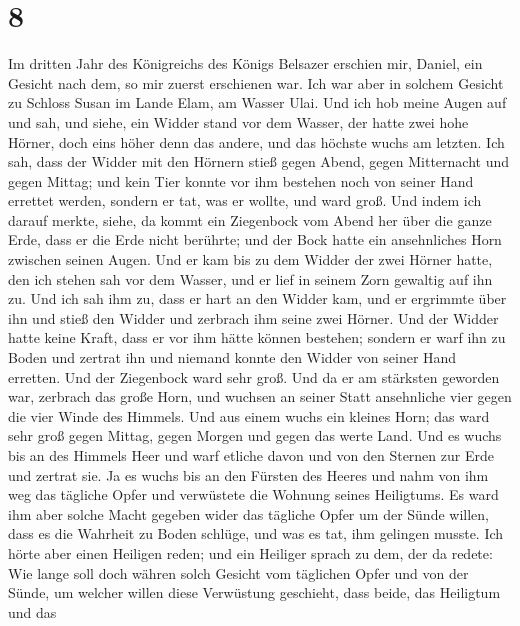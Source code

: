 \hypertarget{section-7}{%
\section{8}\label{section-7}}

 Im dritten Jahr des Königreichs des Königs Belsazer
erschien mir, Daniel, ein Gesicht nach dem, so mir zuerst erschienen
war.  Ich war aber in solchem Gesicht zu Schloss Susan im
Lande Elam, am Wasser Ulai.  Und ich hob meine Augen auf
und sah, und siehe, ein Widder stand vor dem Wasser, der hatte zwei hohe
Hörner, doch eins höher denn das andere, und das höchste wuchs am
letzten.  Ich sah, dass der Widder mit den Hörnern stieß
gegen Abend, gegen Mitternacht und gegen Mittag; und kein Tier konnte
vor ihm bestehen noch von seiner Hand errettet werden, sondern er tat,
was er wollte, und ward groß.  Und indem ich darauf
merkte, siehe, da kommt ein Ziegenbock vom Abend her über die ganze
Erde, dass er die Erde nicht berührte; und der Bock hatte ein
ansehnliches Horn zwischen seinen Augen.  Und er kam bis
zu dem Widder der zwei Hörner hatte, den ich stehen sah vor dem Wasser,
und er lief in seinem Zorn gewaltig auf ihn zu.  Und ich
sah ihm zu, dass er hart an den Widder kam, und er ergrimmte über ihn
und stieß den Widder und zerbrach ihm seine zwei Hörner. Und der Widder
hatte keine Kraft, dass er vor ihm hätte können bestehen; sondern er
warf ihn zu Boden und zertrat ihn und niemand konnte den Widder von
seiner Hand erretten.  Und der Ziegenbock ward sehr groß.
Und da er am stärksten geworden war, zerbrach das große Horn, und
wuchsen an seiner Statt ansehnliche vier gegen die vier Winde des
Himmels.  Und aus einem wuchs ein kleines Horn; das ward
sehr groß gegen Mittag, gegen Morgen und gegen das werte Land.
 Und es wuchs bis an des Himmels Heer und warf etliche
davon und von den Sternen zur Erde und zertrat sie.  Ja
es wuchs bis an den Fürsten des Heeres und nahm von ihm weg das tägliche
Opfer und verwüstete die Wohnung seines Heiligtums.  Es
ward ihm aber solche Macht gegeben wider das tägliche Opfer um der Sünde
willen, dass es die Wahrheit zu Boden schlüge, und was es tat, ihm
gelingen musste.  Ich hörte aber einen Heiligen reden;
und ein Heiliger sprach zu dem, der da redete: Wie lange soll doch
währen solch Gesicht vom täglichen Opfer und von der Sünde, um welcher
willen diese Verwüstung geschieht, dass beide, das Heiligtum und das
